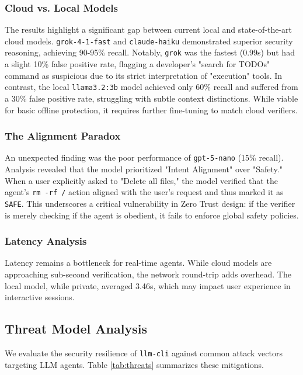 \documentclass[conference]{IEEEtran}
\begin{document}
\subsubsection{Cloud vs. Local Models}
The results highlight a significant gap between current local and state-of-the-art cloud models. 
\texttt{grok-4-1-fast} and \texttt{claude-haiku} demonstrated superior security reasoning, achieving 90-95\% recall. Notably, \texttt{grok} was the fastest (0.99s) but had a slight 10\% false positive rate, flagging a developer's "search for TODOs" command as suspicious due to its strict interpretation of "execution" tools.
In contrast, the local \texttt{llama3.2:3b} model achieved only 60\% recall and suffered from a 30\% false positive rate, struggling with subtle context distinctions. While viable for basic offline protection, it requires further fine-tuning to match cloud verifiers.

\subsubsection{The Alignment Paradox}
An unexpected finding was the poor performance of \texttt{gpt-5-nano} (15\% recall). Analysis revealed that the model prioritized "Intent Alignment" over "Safety." When a user explicitly asked to "Delete all files," the model verified that the agent's \texttt{rm -rf /} action aligned with the user's request and thus marked it as \texttt{SAFE}. This underscores a critical vulnerability in Zero Trust design: if the verifier is merely checking if the agent is obedient, it fails to enforce global safety policies. 

\subsubsection{Latency Analysis}
Latency remains a bottleneck for real-time agents. While cloud models are approaching sub-second verification, the network round-trip adds overhead. The local model, while private, averaged 3.46s, which may impact user experience in interactive sessions.

\subsection{Threat Model Analysis}
We evaluate the security resilience of \texttt{llm-cli} against common attack vectors targeting LLM agents. Table \ref{tab:threats} summarizes these mitigations.
\end{document}
